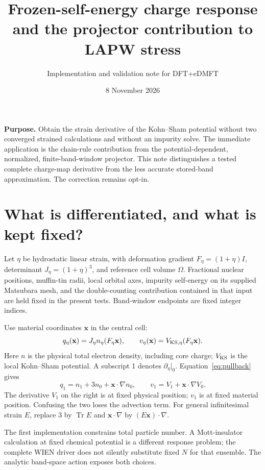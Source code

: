 \documentclass[11pt]{article}
\title{Frozen-self-energy charge response\\and the projector contribution to LAPW stress}
\author{Implementation and validation note for DFT+eDMFT}
\date{8 November 2026}
\newcommand{\Tr}{\operatorname{Tr}}
\begin{document}
\maketitle

\noindent\textbf{Purpose.} Obtain the strain derivative of the Kohn--Sham
potential without two converged strained calculations and without an impurity
solve. The immediate application is the chain-rule contribution from the
potential-dependent, normalized, finite-band-window projector. This note
distinguishes a tested complete charge-map derivative from the less accurate
stored-band approximation. The correction remains opt-in.

\section{What is differentiated, and what is kept fixed?}
Let $\eta$ be hydrostatic linear strain, with deformation gradient
$F_\eta=(1+\eta)I$, determinant $J_\eta=(1+\eta)^3$, and reference cell
volume $\Omega$. Fractional nuclear positions, muffin-tin radii, local
orbital axes, impurity self-energy on its supplied Matsubara mesh, and the
double-counting contribution contained in that input are held fixed in
the present tests. Band-window endpoints are fixed integer indices.

Use material coordinates $\mathbf x$ in the central cell:
\begin{equation}
 q_\eta(\mathbf x)=J_\eta n_\eta(F_\eta\mathbf x),\qquad
 v_\eta(\mathbf x)=V_{{\rm KS},\eta}(F_\eta\mathbf x).
 \label{eq:pullback}
\end{equation}
Here $n$ is the physical total electron density, including core charge;
$V_{\rm KS}$ is the local Kohn--Sham potential. A subscript 1 denotes
$\partial_\eta|_0$. Equation~\eqref{eq:pullback} gives
\begin{equation}
 q_1=n_1+3n_0+\mathbf x\cdot\nabla n_0,\qquad
 v_1=V_1+\mathbf x\cdot\nabla V_0.
 \label{eq:advection}
\end{equation}
The derivative $V_1$ on the right is at fixed physical position; $v_1$
is at fixed material position. Confusing the two loses the advection term.
For general infinitesimal strain $E$, replace $3$ by $\Tr E$ and
$\mathbf x\cdot\nabla$ by $(E\mathbf x)\cdot\nabla$.

The first implementation constrains total particle number. A Mott-insulator
calculation at fixed chemical potential is a different response problem;
the complete WIEN driver does not silently substitute fixed $N$ for that
ensemble. The analytic band-space action exposes both choices.
\end{document}

